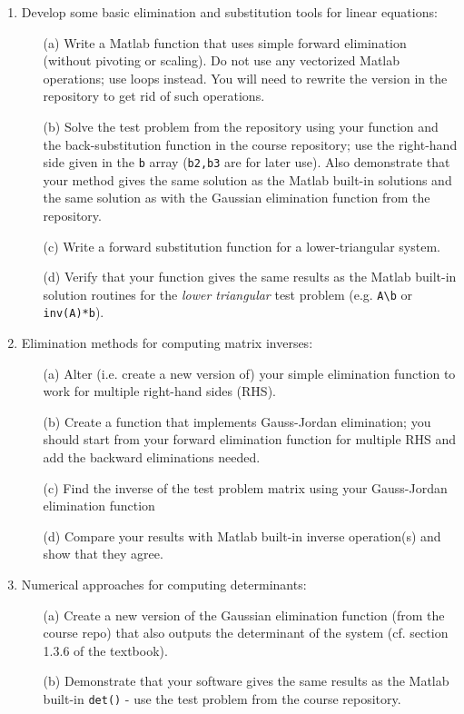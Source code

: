\documentclass{article}
\begin{document}
\begin{enumerate}
  \item Develop some basic elimination and substitution tools for linear equations:   
  \begin{itemize}
    \item[(a)] Write a Matlab function that uses simple forward elimination (without pivoting or scaling).  Do not use any vectorized Matlab operations; use loops instead.  You will need to rewrite the version in the repository to get rid of such operations.  
    \item[(b)] Solve the test problem from the repository using your function and the back-substitution function in the course repository; use the right-hand side given in the \texttt{b} array (\texttt{b2,b3} are for later use).   Also demonstrate that your method gives the same solution as the Matlab built-in solutions and the same solution as with the Gaussian elimination function from the repository. 
    \item[(c)] Write a forward substitution function for a lower-triangular system.  
    \item[(d)] Verify that your function gives the same results as the Matlab built-in solution routines for the \emph{lower triangular} test problem (e.g. \texttt{A\textbackslash b} or \texttt{inv(A)*b}).  
  \end{itemize}
  
  \item Elimination methods for computing matrix inverses:  
  \begin{itemize}
    \item[(a)] Alter (i.e. create a new version of) your simple elimination function to work for multiple right-hand sides (RHS).  
    \item[(b)] Create a function that implements Gauss-Jordan elimination; you should start from your forward elimination function for multiple RHS and add the backward eliminations needed.  
    \item[(c)] Find the inverse of the test problem matrix using your Gauss-Jordan elimination function
    \item[(d)] Compare your results with Matlab built-in inverse operation(s) and show that they agree.
  \end{itemize}

  \item Numerical approaches for computing determinants:  
  \begin{itemize}
    \item[(a)] Create a new version of the Gaussian elimination function (from the course repo) that also outputs the determinant of the system (cf. section 1.3.6 of the textbook).  
    \item[(b)] Demonstrate that your software gives the same results as the Matlab built-in \texttt{det()} - use the test problem from the course repository.  
    
  \end{itemize}
\end{enumerate}
\end{document}
